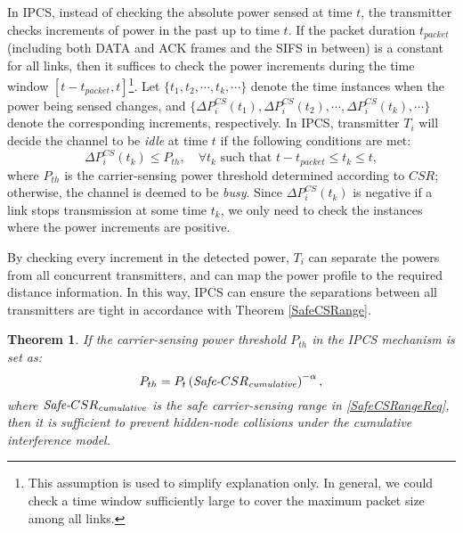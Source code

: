 \documentclass[conference]{IEEEtran}
\newtheorem{theorem}{Theorem}
\begin{document}
In IPCS, instead of checking the absolute power sensed at time $t$,
the transmitter checks increments of power in the past up to time
$t$. If the packet duration $t_{packet}$ (including both DATA and
ACK frames and the SIFS in between) is a constant for all links,
then it suff\/ices to check the power increments during the time
window $[t-t_{packet},t]$\footnote[4]{This assumption is used to
simplify explanation only. In general, we could check a time window
suff\/iciently large to cover the maximum packet size among all
links.}. Let $\{t_1, t_2, \cdots, t_k, \cdots\}$ denote the time
instances when the power being sensed changes, and $\{\Delta
P_{i}^{CS}(t_1), \Delta P_{i}^{CS}(t_2), \cdots, \Delta
P_{i}^{CS}(t_k), \cdots\}$ denote the corresponding increments,
respectively. In IPCS, transmitter $T_i$ will decide the channel to
be \emph{idle} at time $t$ if the following conditions are met:
\begin{equation}
\Delta P_{i}^{CS}(t_k)\leq P_{th}, \quad \forall t_k \text{ such
that } t-t_{packet}\leq t_k\leq t,\label{IPCScondition}
\end{equation}
where $P_{th}$ is the carrier-sensing power threshold determined
according to $CSR$; otherwise, the channel is deemed to be
\emph{busy}. Since $\Delta P_{i}^{CS}(t_k)$ is negative if a link
stops transmission at some time $t_k$, we only need to check the
instances where the power increments are positive.







By checking every increment in the detected power, $T_i$ can
separate the powers from all concurrent transmitters, and can map
the power prof\/ile to the required distance information. In this
way, IPCS can ensure the separations between all transmitters are
tight in accordance with Theorem \ref{SafeCSRange}.



\begin{theorem}\label{theorem2}
If the carrier-sensing power threshold $P_{th}$ in the IPCS
mechanism is set as:
\begin{equation}
\label{safeIPth}
P_{th}=P_t\left(\text{\emph{Safe-}}CSR_{\text{\emph{cumulative}}}\right)^{-\alpha},
\end{equation}
where $\text{\emph{Safe-}}CSR_{\text{\emph{cumulative}}}$ is the
safe carrier-sensing range in \eqref{SafeCSRangeReq}, then it is
suff\/icient to prevent hidden-node collisions under the cumulative
interference model.
\end{theorem}
\end{document}

